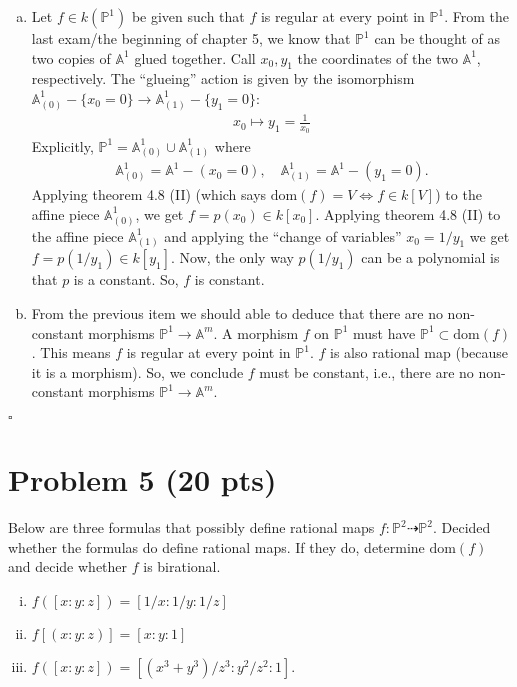\documentclass[12pt]{article}
\newcommand{\A}{\mathbb{A}}
\newcommand{\f}[2]{\frac{#1}{#2}}
\begin{document}
\begin{enumerate}[(a)]
	\item Let $f \in k(\mathbb{P}^1)$ be given such that $f$ is regular at every point in $\mathbb{P}^1$. From the last exam/the beginning of chapter 5, we know that $\mathbb{P}^1$ can be thought of as two copies of $\A^1$ glued together. Call $x_0,y_1$ the coordinates of the two $\A^1$, respectively. The ``glueing'' action is given by the isomorphism $\A^1_{(0)} - \{x_0 = 0\} \to \A^1_{(1)}-\{y_1=0\}$:
	\begin{align*}
	x_0 \mapsto y_1 = \f{1}{x_0}
	\end{align*}
	Explicitly, $\mathbb{P}^1 = \A^1_{(0)} \cup \A^1_{(1)}$ where
	\begin{align*}
	\A^1_{(0)} = \A^1 - (x_0 = 0), \quad \A^1_{(1)} = \A^1 - (y_1 =0).
	\end{align*} 
	Applying theorem 4.8 (II) (which says $\mbox{dom}(f) = V \iff f \in k[V]$) to the affine piece $\A^1_{(0)}$, we get $f = p(x_0) \in k[x_0]$. Applying theorem 4.8 (II) to the affine piece $\A^1_{(1)}$ and applying the ``change of variables'' $x_0 = 1/y_1$ we get $f = p(1/y_1) \in k[y_1]$. Now, the only way $p(1/y_1)$ can be a polynomial is that $p$ is a constant. So, $f$ is constant. 
	
	
	
	\item  From the previous item we should able to deduce that there are no non-constant morphisms $\mathbb{P}^1 \to \A^m$. A morphism $f$ on $\mathbb{P}^1$ must have $\mathbb{P}^1 \subset \mbox{dom}(f) $. This means $f$ is regular at every point in $\mathbb{P}^1$. $f$ is also rational map (because it is a morphism). So, we conclude $f$ must be constant, i.e., there are no non-constant morphisms $\mathbb{P}^1 \to \A^m$. 	
\end{enumerate}
\hfill $\square$


















\newpage





\section*{Problem 5 \small{(20 pts)}} 
Below are three formulas that possibly define rational maps $f: \mathbb{P}^2 \dashrightarrow \mathbb{P}^2$. Decided whether the formulas do define rational maps. If they do, determine $\mbox{dom}(f)$ and decide whether $f$ is birational. 
\begin{enumerate}[(i)]
	\item $f([x:y:z]) = [1/x:1/y:1/z]$
	\item $f[(x:y:z)] = [x:y:1]$
	\item $f([x:y:z]) = [(x^3+y^3)/z^3 : y^2/z^2 : 1]$.
\end{enumerate}
\end{document}
